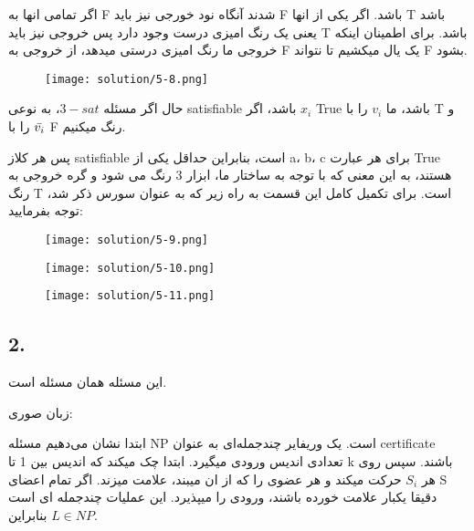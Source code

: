 اگر تمامی انها به F شدند آنگاه نود خورجی نیز باید F باشد.
اگر یکی از انها T باشد یعنی یک رنگ امیزی درست وجود دارد پس خروجی نیز باید T باشد.
برای اطمینان اینکه خروجی ما رنگ امیزی درستی میدهد، از خروجی به F یک یال میکشیم تا نتواند F بشود.
\begin{figure}[H]
    \centering
    \texttt{[image: solution/5-8.png]}
\end{figure}

حال اگر مسئله $3-sat$، به نوعی 
satisfiable باشد،
اگر $x_i$ True باشد، ما $v_i$ را با T
و $\Bar{v_i}$ را با F رنگ میکنیم.

پس هر کلاز satisfiable است، بنابراین حداقل یکی از a، b، c برای هر عبارت True هستند، به این معنی که با توجه به ساختار ما، ابزار 3 رنگ می شود و گره خروجی به رنگ T است.
برای تکمیل کامل این قسمت به راه زیر که به عنوان سورس ذکر شد، توجه بفرمایید:
\begin{figure}[H]
    \centering
    \texttt{[image: solution/5-9.png]}
\end{figure}

\begin{figure}[H]
    \centering
    \texttt{[image: solution/5-10.png]}
\end{figure}

\begin{figure}[H]
    \centering
    \texttt{[image: solution/5-11.png]}
\end{figure}


\subsection*{2. }
این مسئله همان مسئله
است.

زبان صوری:
\begin{center}
\end{center}
ابتدا نشان می‌دهیم مسئله NP است.
یک وریفایر چندجمله‌ای به عنوان certificate تعدادی اندیس ورودی میگیرد.
ابتدا چک میکند که اندیس بین 1 تا k باشند.
سپس روی هر $S_i$ حرکت میکند و هر عضوی را که از ان میبند، علامت میزند. اگر تمام اعضای S دقیقا یکبار علامت خورده باشند، ورودی را میپذیرد.
این عملیات چندجمله ای است بنابراین 
$L\in NP$.


